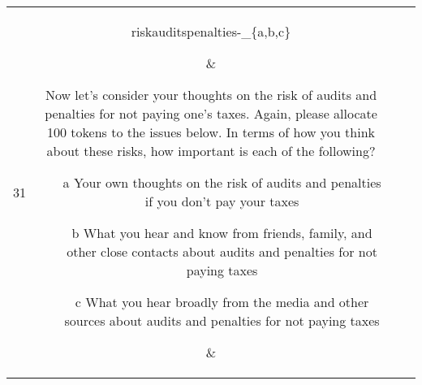 \begin{table}[!h]
{\begin{tabular}{|c|c|c|c|}
31&   \parbox[c][0.05\textheight][c]{0.17\textwidth} { riskauditspenalties-\_\{a,b,c\} } & \parbox[c][0.20\textheight][c]{0.5\textwidth} {Now let's consider your thoughts on the risk of audits and penalties for not paying one's taxes.  Again, please allocate 100 tokens to the issues below.  
In terms of how you think about these risks, how important is each of the following?
\vspace{-1em}
\begin{itemize}\setlength\itemsep{-0.5em}
\item[a] Your own thoughts on the risk of audits and penalties if you don't pay your taxes
\item[b] What you hear and know from friends, family, and other close contacts about audits and penalties for not paying taxes 
\item[c] What you hear broadly from the media and other sources about audits and penalties for not paying taxes 
\end{itemize}
}
&\parbox[c][0.05\textheight][c]{0.18\textwidth}{  }\\  \hline


\end{tabular}
}
\end{table}